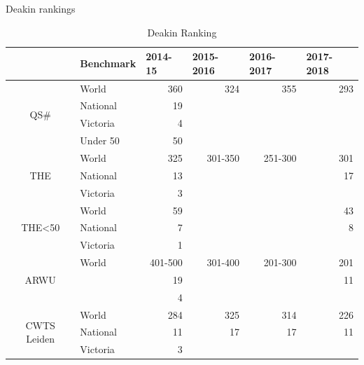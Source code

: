 \documentclass[
 size=14pt,
 paper=smartboard,  %
 mode=present, 		%
 display=slides, 	%
 style=tuliplab,  	%
 pauseslide,
 fleqn,leqno]{powerdot}
\begin{document}
\begin{slide}{Deakin rankings}
\begin{table}[htbp]
  \centering
  \caption{Deakin Ranking}
    \begin{tabular}{clrrrr}
    \toprule
      & Benchmark & \multicolumn{1}{l}{2014-15} & \multicolumn{1}{l}{2015-2016} & \multicolumn{1}{l}{2016-2017} & \multicolumn{1}{l}{2017-2018} \\ \midrule
    \multirow{4}[0]{*}{QS\#} & World  & 360 & 324 & 355 & 293 \\
      & National & 19 &   &   &  \\
      & Victoria & 4 &   &   &  \\
      & Under 50 & 50 &   &   &  \\ \midrule
    \multirow{3}[0]{*}{THE} & World  & 325 & 301-350 & 251-300 & 301 \\
      & National  & 13 &   &   & 17 \\
      & Victoria & 3 &   &   &  \\ \midrule
    \multirow{3}[0]{*}{THE<50} & World  & 59 &   &   & 43 \\
      & National  & 7 &   &   & 8 \\
      & Victoria & 1 &   &   &  \\ \midrule
    \multirow{3}[0]{*}{ARWU} & World & 401-500 & 301-400 & 201-300 & 201 \\
      &   & 19 &   &   & 11 \\
      &   & 4 &   &   &  \\ \midrule
    \multirow{3}[0]{*}{CWTS Leiden} & World  & 284 & 325 & 314 & 226 \\
      & National  & 11 & 17 & 17 & 11 \\
      & Victoria & 3 &   &   &  \\ \bottomrule
    \end{tabular}%
  \label{tab:Deakin Ranking}%
\end{table}%
\end{slide}
\end{document}

